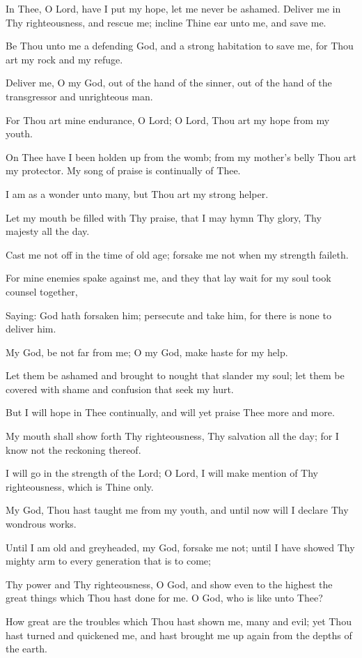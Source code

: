 In Thee, O Lord, have I put my hope, let me never be ashamed. Deliver me in Thy righteousness, and rescue me; incline Thine ear unto me, and save me.

Be Thou unto me a defending God, and a strong habitation to save me, for Thou art my rock and my refuge.

Deliver me, O my God, out of the hand of the sinner, out of the hand of the transgressor and unrighteous man.

For Thou art mine endurance, O Lord; O Lord, Thou art my hope from my youth.

On Thee have I been holden up from the womb; from my mother's belly Thou art my protector. My song of praise is continually of Thee.

I am as a wonder unto many, but Thou art my strong helper.

Let my mouth be filled with Thy praise, that I may hymn Thy glory, Thy majesty all the day.

Cast me not off in the time of old age; forsake me not when my strength faileth.

For mine enemies spake against me, and they that lay wait for my soul took counsel together,

Saying: God hath forsaken him; persecute and take him, for there is none to deliver him.

My God, be not far from me; O my God, make haste for my help.

Let them be ashamed and brought to nought that slander my soul; let them be covered with shame and confusion that seek my hurt.

But I will hope in Thee continually, and will yet praise Thee more and more.

My mouth shall show forth Thy righteousness, Thy salvation all the day; for I know not the reckoning thereof.

I will go in the strength of the Lord; O Lord, I will make mention of Thy righteousness, which is Thine only.

My God, Thou hast taught me from my youth, and until now will I declare Thy wondrous works.

Until I am old and greyheaded, my God, forsake me not; until I have showed Thy mighty arm to every generation that is to come;

Thy power and Thy righteousness, O God, and show even to the highest the great things which Thou hast done for me. O God, who is like unto Thee?

How great are the troubles which Thou hast shown me, many and evil; yet Thou hast turned and quickened me, and hast brought me up again from the depths of the earth.

